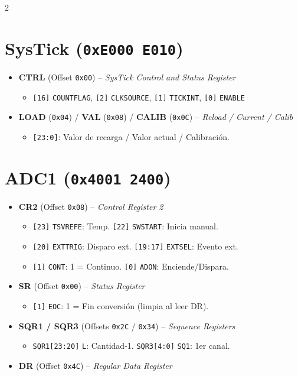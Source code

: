 \documentclass[10pt,a4paper]{article}
\begin{document}
\begin{multicols*}{2}
\section*{SysTick (\texttt{0xE000 E010})}
\begin{itemize}
    \item \textbf{CTRL} (Offset \texttt{0x00}) -- \textit{SysTick Control and Status Register}
    \begin{itemize}
        \item \texttt{[16]} \texttt{COUNTFLAG}, \texttt{[2]} \texttt{CLKSOURCE}, \texttt{[1]} \texttt{TICKINT}, \texttt{[0]} \texttt{ENABLE}
    \end{itemize}
    \item \textbf{LOAD} (\texttt{0x04}) / \textbf{VAL} (\texttt{0x08}) / \textbf{CALIB} (\texttt{0x0C}) -- \textit{Reload / Current / Calib}
    \begin{itemize}
        \item \texttt{[23:0]}: Valor de recarga / Valor actual / Calibración.
    \end{itemize}
\end{itemize}

\section*{ADC1 (\texttt{0x4001 2400})}
\begin{itemize}
    \item \textbf{CR2} (Offset \texttt{0x08}) -- \textit{Control Register 2}
    \begin{itemize}
        \item \texttt{[23]} \texttt{TSVREFE}: Temp. \texttt{[22]} \texttt{SWSTART}: Inicia manual.
        \item \texttt{[20]} \texttt{EXTTRIG}: Disparo ext. \texttt{[19:17]} \texttt{EXTSEL}: Evento ext.
        \item \texttt{[1]} \texttt{CONT}: 1 = Continuo. \texttt{[0]} \texttt{ADON}: Enciende/Dispara.
    \end{itemize}
    \item \textbf{SR} (Offset \texttt{0x00}) -- \textit{Status Register}
    \begin{itemize}
        \item \texttt{[1]} \texttt{EOC}: 1 = Fin conversión (limpia al leer DR).
    \end{itemize}
    \item \textbf{SQR1 / SQR3} (Offsets \texttt{0x2C} / \texttt{0x34}) -- \textit{Sequence Registers}
    \begin{itemize}
        \item \texttt{SQR1[23:20]} \texttt{L}: Cantidad-1. \texttt{SQR3[4:0]} \texttt{SQ1}: 1er canal.
    \end{itemize}
    \item \textbf{DR} (Offset \texttt{0x4C}) -- \textit{Regular Data Register}
\end{itemize}


\end{multicols*}
\end{document}
